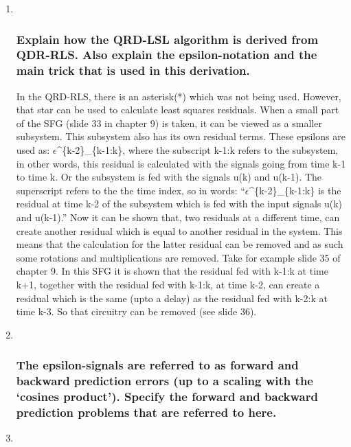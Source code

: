 \documentclass[
  a4paper,
  ,captions=tableheading
]{scrartcl}
\begin{document}
\begin{enumerate}
\def\labelenumi{\arabic{enumi}.}
\item ~
  \subsubsection{Explain how the QRD-LSL algorithm is derived from
  QDR-RLS. Also explain the epsilon-notation and the main trick that is
  used in this
  derivation.}\label{explain-how-the-qrd-lsl-algorithm-is-derived-from-qdr-rls.-also-explain-the-epsilon-notation-and-the-main-trick-that-is-used-in-this-derivation.}

  In the QRD-RLS, there is an asterisk(*) which was not being used.
  However, that star can be used to calculate least squares residuals.
  When a small part of the SFG (slide 33 in chapter 9) is taken, it can
  be viewed as a smaller subsystem. This subsystem also has its own
  residual terms. These epsilons are used as:
  \(\epsilon\)\^{}\{k-2\}\_\{k-1:k\}, where the subscript k-1:k refers
  to the subsystem, in other words, this residual is calculated with the
  signals going from time k-1 to time k. Or the subsystem is fed with
  the signals u(k) and u(k-1). The superscript refers to the the time
  index, so in words: ``\(\epsilon\)\^{}\{k-2\}\_\{k-1:k\} is the
  residual at time k-2 of the subsystem which is fed with the input
  signals u(k) and u(k-1).'' Now it can be shown that, two residuals at
  a different time, can create another residual which is equal to
  another residual in the system. This means that the calculation for
  the latter residual can be removed and as such some rotations and
  multiplications are removed. Take for example slide 35 of chapter 9.
  In this SFG it is shown that the residual fed with k-1:k at time k+1,
  together with the residual fed with k-1:k, at time k-2, can create a
  residual which is the same (upto a delay) as the residual fed with
  k-2:k at time k-3. So that circuitry can be removed (see slide 36).
\item ~
  \subsubsection{The epsilon-signals are referred to as forward and
  backward prediction errors (up to a scaling with the `cosines
  product'). Specify the forward and backward prediction problems that
  are referred to
  here.}\label{the-epsilon-signals-are-referred-to-as-forward-and-backward-prediction-errors-up-to-a-scaling-with-the-cosines-product.-specify-the-forward-and-backward-prediction-problems-that-are-referred-to-here.}
\item ~

\end{enumerate}
\end{document}
